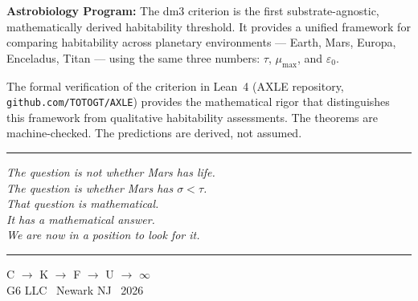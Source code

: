 \textbf{Astrobiology Program:}
The dm3 criterion is the first substrate-agnostic, mathematically
derived habitability threshold. It provides a unified framework
for comparing habitability across planetary environments --- Earth,
Mars, Europa, Enceladus, Titan --- using the same three numbers:
$\tau$, $\mu_{\max}$, and $\varepsilon_0$.

The formal verification of the criterion in Lean~4 (AXLE repository,
\texttt{github.com/TOTOGT/AXLE}) provides the mathematical rigor
that distinguishes this framework from qualitative habitability
assessments. The theorems are machine-checked. The predictions
are derived, not assumed.

\bigskip
\begin{center}
\rule{0.5\textwidth}{0.4pt}

\vspace{0.4cm}

\textit{The question is not whether Mars has life.\\
The question is whether Mars has $\sigma < \tau$.\\
That question is mathematical.\\
It has a mathematical answer.\\
We are now in a position to look for it.}

\vspace{0.4cm}
\rule{0.5\textwidth}{0.4pt}
\end{center}

\bigskip
\begin{flushright}
C \;$\to$\; K \;$\to$\; F \;$\to$\; U \;$\to$\; $\infty$\\[0.3em]
G6 LLC \textperiodcentered\ Newark NJ \textperiodcentered\ 2026
\end{flushright}
